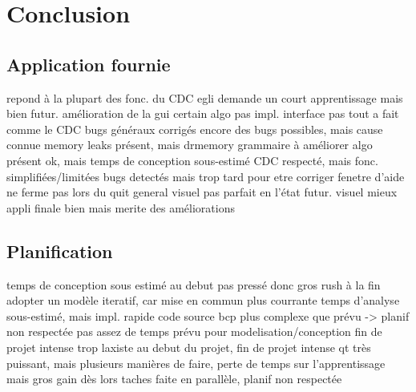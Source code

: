 \documentclass[french]{article}
\begin{document}
	\section{Conclusion}
	
		\subsection{Application fournie}
			repond à la plupart des fonc. du CDC
			egli demande un court apprentissage mais bien
			futur. amélioration de la gui
			certain algo pas impl.
			interface pas tout a fait comme le CDC
			bugs généraux corrigés
			encore des bugs possibles, mais cause connue 
			memory leaks présent, mais drmemory
			grammaire à améliorer
			algo présent ok, mais temps de conception sous-estimé
			CDC respecté, mais fonc. simplifiées/limitées
			bugs detectés mais trop tard pour etre corriger
			fenetre d'aide ne ferme pas lors du quit general
			visuel pas parfait en l'état
			futur. visuel mieux
			appli finale bien mais merite des améliorations
		
		\subsection{Planification}
			
			temps de conception sous estimé
			au debut pas pressé donc gros rush à la fin
			adopter un modèle iteratif, car mise en commun plus courrante
			temps d'analyse sous-estimé, mais impl. rapide
			code source bcp plus complexe que prévu -> planif non respectée
			pas assez de temps prévu pour modelisation/conception
			fin de projet intense
			trop laxiste au debut du projet, fin de projet intense
			qt très puissant, mais plusieurs manières de faire, perte de temps sur l'apprentissage mais gros gain dès lors
			taches faite en parallèle, planif non respectée
			
\end{document}
